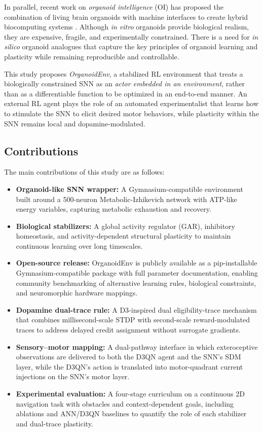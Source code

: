 \documentclass[journal,twocolumn]{IEEEtran}
\begin{document}
In parallel, recent work on \emph{organoid intelligence} (OI) has
proposed the combination of living brain organoids with machine
interfaces to create hybrid biocomputing systems
\cite{Smirnova2023OI,Hartung2023OIworkshop}.  Although \emph{in
vitro} organoids provide biological realism, they are expensive,
fragile, and experimentally constrained.  There is a need for
\emph{in silico} organoid analogues that capture the key principles
of organoid learning and plasticity while remaining reproducible and
controllable.

This study proposes \emph{OrganoidEnv}, a stabilized RL environment
that treats a biologically constrained SNN as an \emph{actor embedded
in an environment}, rather than as a differentiable function to be
optimized in an end-to-end manner.  An external RL agent plays the
role of an automated experimentalist that learns how to stimulate the
SNN to elicit desired motor behaviors, while plasticity within the
SNN remains local and dopamine-modulated.

\subsection{Contributions}

The main contributions of this study are as follows:

\begin{itemize}
\item \textbf{Organoid-like SNN wrapper:} A Gymnasium-compatible
      environment built around a 500-neuron Metabolic-Izhikevich
      network with ATP-like energy variables, capturing metabolic
      exhaustion and recovery.
\item \textbf{Biological stabilizers:} A global activity regulator
      (GAR), inhibitory homeostasis, and activity-dependent structural
      plasticity to maintain continuous learning over long timescales.
\item \textbf{Open-source release:} OrganoidEnv is publicly available as a 
      pip-installable Gymnasium-compatible package with full parameter 
      documentation, enabling community benchmarking of alternative learning 
      rules, biological constraints, and neuromorphic hardware mappings.
\item \textbf{Dopamine dual-trace rule:} A D3-inspired dual
      eligibility-trace mechanism that combines millisecond-scale STDP
      with second-scale reward-modulated traces to address delayed
      credit assignment without surrogate gradients.
\item \textbf{Sensory--motor mapping:} A dual-pathway interface in
      which exteroceptive observations are delivered to both the D3QN
      agent and the SNN's SDM layer, while the D3QN's action is
      translated into motor-quadrant current injections on the SNN's
      motor layer.
\item \textbf{Experimental evaluation:} A four-stage curriculum on a
      continuous 2D navigation task with obstacles and context-dependent
      goals, including ablations and ANN/D3QN baselines to quantify the
      role of each stabilizer and dual-trace plasticity.
\end{itemize}
\end{document}

